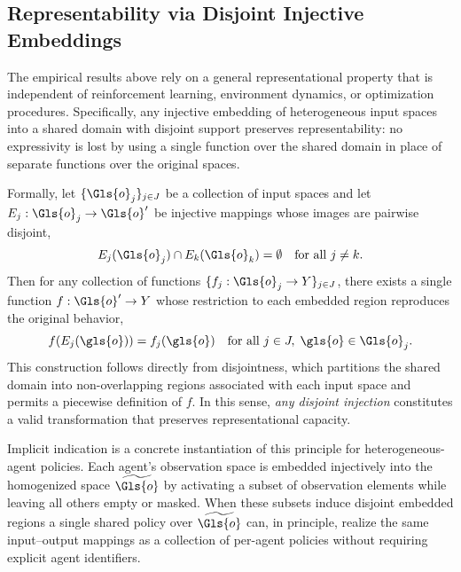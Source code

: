 \documentclass[]{jair}
\newcommand{\Hom}[1]{\widetilde{#1}}
\begin{document}
\subsection{Representability via Disjoint Injective Embeddings}

The empirical results above rely on a general representational property that is
independent of reinforcement learning, environment dynamics, or optimization
procedures. Specifically, any injective embedding of heterogeneous input spaces
into a shared domain with disjoint support preserves representability: no
expressivity is lost by using a single function over the shared domain in place of
separate functions over the original spaces.

Formally, let \(\{\Gls{o}_j\}_{j \in J}\) be a collection of input spaces and let
\(E_j : \Gls{o}_j \rightarrow \Gls{o}'\) %
be injective mappings whose images are pairwise disjoint,
\[
    E_j(\Gls{o}_j) \cap E_k(\Gls{o}_k) = \emptyset \quad \text{for all } j \neq k.
\]
Then for any collection of functions
\(\{f_j : \Gls{o}_j \rightarrow Y\}_{j \in J}\),
there exists a single function \(f : \Gls{o}' \rightarrow Y\) 
whose restriction to each embedded region reproduces the original behavior,
\[
    f(E_j(\gls{o})) = f_j(\gls{o}) %
    \quad \text{for all } j \in J,\; \gls{o} \in \Gls{o}_j.
\]
This construction follows directly from disjointness, which partitions the shared
domain into non-overlapping regions associated with each input space and permits a
piecewise definition of \(f\). In this sense, \emph{any disjoint injection}
constitutes a valid transformation that preserves representational capacity.

Implicit indication is a concrete instantiation of this
principle for heterogeneous-agent policies. Each agent's observation space is
embedded injectively into the homogenized space \(\Hom{\Gls{o}}\) by activating a subset
of observation elements while leaving all others empty or masked. 
When these subsets induce disjoint embedded regions a single shared policy 
over \(\Hom{\Gls{o}}\) can, in principle, realize the same input--output mappings 
as a collection of per-agent policies without requiring explicit agent identifiers.

\end{document}
